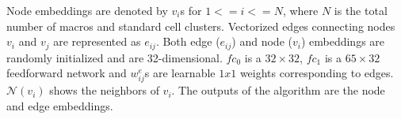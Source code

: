 \documentclass{article}
\begin{document}
Node embeddings are denoted by $v_i$s for $1<=i<=N$, where $N$ is the total number of macros and standard cell clusters. Vectorized edges connecting nodes $v_i$ and $v_j$ are represented as $e_{ij}$. Both edge ($e_{ij}$) and node ($v_i$) embeddings are randomly initialized and are 32-dimensional. $fc_0$ is a $32\times32$, $fc_1$ is a $65\times 32$ feedforward network and $w^e_{ij}$s are learnable $1x1$ weights corresponding to edges. $\mathcal{N}(v_i)$ shows the neighbors of $v_i$. The outputs of the algorithm are the node and edge embeddings. 
 



\end{document}
